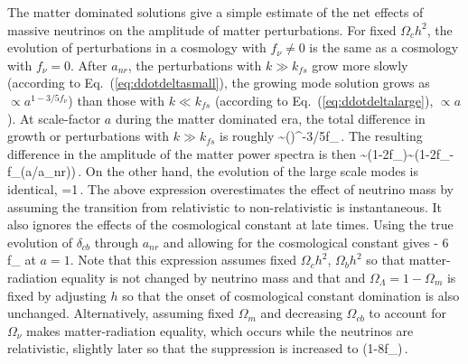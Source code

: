 The matter dominated solutions give a simple estimate of the net effects of massive neutrinos on the amplitude of matter perturbations. For fixed $\Omega_c h^2$, the evolution of perturbations in a cosmology with $f_\nu \neq 0$ is the same as a cosmology with $f_\nu =0$. After $a_{nr}$, the perturbations with $k\gg k_{fs}$ grow more slowly (according to Eq.~(\ref{eq:ddotdeltasmall}), the growing mode solution grows as  $\propto a^{1-3/5f_\nu}$) than those with $k\ll k_{fs}$ (according to Eq.~(\ref{eq:ddotdeltalarge}), $\propto a$).  At scale-factor $a$ during the matter dominated era, the total difference in growth or perturbations with $k\gg k_{fs}$ is roughly
\beq
{} \sim \left(\right)^{-3/5f_\nu}\,.
\eeq
The resulting difference in the amplitude of the matter power spectra is then 
\beq
{}\sim (1-2f_\nu)\sim \left(1-2f_\nu -f_\nu\ln\left(a/a_{nr}\right)\right)\,.
\eeq
On the other hand, the evolution of the large scale modes is identical,
\beq
{}=1\,.
\eeq
The above expression overestimates the effect of neutrino mass by assuming the transition from relativistic to non-relativistic is instantaneous. It also ignores the effects of the cosmological constant at late times. Using the true evolution of $\delta_{cb}$ through $a_{nr}$ and allowing for the cosmological constant gives 
\beq
{} - 6 f_\nu
\eeq
at $a=1$. Note that this expression assumes fixed $\Omega_ch^2$, $\Omega_bh^2$ so that matter-radiation equality is not changed by neutrino mass and that and $\Omega_\Lambda = 1-\Omega_m$ is fixed by adjusting $h$ so that the onset of cosmological constant domination is also unchanged. Alternatively, assuming fixed $\Omega_m$ and decreasing $\Omega_{cb}$ to account for $\Omega_\nu$ makes matter-radiation equality, which occurs while the neutrinos are relativistic, slightly later so that the suppression is increased to
\beq
{} \approx (1-8f_\nu)\,.
\eeq

